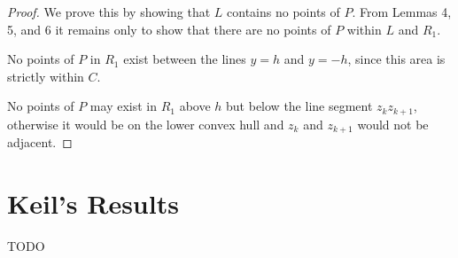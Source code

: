 \documentclass{tufte-handout}
\begin{document}
\begin{proof}

  We prove this by showing that $L$ contains no points of $P$.  From
  Lemmas 4, 5, and 6 it remains only to show that there are no points
  of $P$ within $L$ and $R_1$.

  No points of $P$ in $R_1$ exist between the lines $y=h$ and $y=-h$,
  since this area is strictly within $C$.

  No points of $P$ may exist in $R_1$ above $h$ but below the line
  segment $z_kz_{k+1}$, otherwise it would be on the lower convex hull
  and $z_k$ and $z_{k+1}$ would not be adjacent.

\end{proof}

\newpage
\part{Keil's Results}

TODO


\newpage

\end{document}

